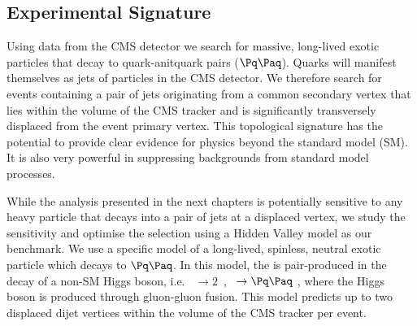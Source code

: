 \subsection{Experimental Signature}

Using data from the CMS detector we search for massive, long-lived exotic particles \X that decay
to quark-anitquark pairs ($\qq$). Quarks will manifest themselves as jets of particles in the 
CMS detector.
We therefore search for events
containing a pair of jets originating from a common secondary
vertex that lies within the volume of the CMS tracker and is significantly transversely displaced from the event
 primary vertex.
This topological signature has the potential to provide clear evidence for
physics beyond the standard model (SM). It is also very powerful in suppressing backgrounds from
standard model processes.

While the analysis presented in the next chapters is potentially sensitive 
to any heavy particle that decays into a pair of jets
 at a displaced vertex, we study the sensitivity and optimise the selection using a Hidden Valley
model as our benchmark. We use a specific model of a long-lived, spinless, neutral
exotic particle \X which decays to $\qq$. In this
model, the \X is pair-produced in the decay of a non-SM Higgs boson, i.e.  \Higgs~$\to
2$\X~, \X~$\to \qq$ \cite{Strassler:2006ri}, where the Higgs boson is produced through gluon-gluon
fusion. This model predicts up to two displaced
dijet vertices within the volume of the CMS tracker per event.




